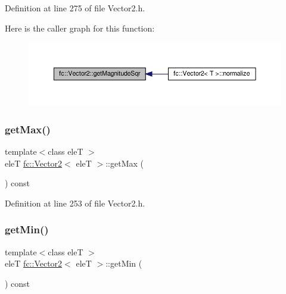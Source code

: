 Definition at line 275 of file Vector2.\+h.

Here is the caller graph for this function\+:
\nopagebreak
\begin{figure}[H]
\begin{center}
\leavevmode
\includegraphics[width=350pt]{d9/d08/classfc_1_1Vector2_a936d1ee4ee9945867b816f91d2a6f3f5_icgraph}
\end{center}
\end{figure}
\mbox{\label{classfc_1_1Vector2_af599d74fd880011bc0b946b38453a9c4}} 
\subsubsection{\texorpdfstring{get\+Max()}{getMax()}}
{\footnotesize\ttfamily template$<$class eleT $>$ \\
eleT \hyperlink{classfc_1_1Vector2}{fc\+::\+Vector2}$<$ eleT $>$\+::get\+Max (\begin{DoxyParamCaption}{ }\end{DoxyParamCaption}) const}



Definition at line 253 of file Vector2.\+h.

\mbox{\label{classfc_1_1Vector2_a0b01872ead70d4faf63b1c80e9a1b77e}} 
\subsubsection{\texorpdfstring{get\+Min()}{getMin()}}
{\footnotesize\ttfamily template$<$class eleT $>$ \\
eleT \hyperlink{classfc_1_1Vector2}{fc\+::\+Vector2}$<$ eleT $>$\+::get\+Min (\begin{DoxyParamCaption}{ }\end{DoxyParamCaption}) const}



